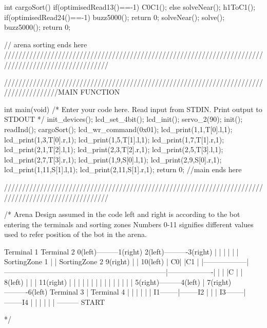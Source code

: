 int cargoSort()
{
    if(optimisedRead13()==-1)
	{
		C0C1();
	}
	else
	{
		solveNear();
		h1ToC1();
    }
	if(optimisedRead24()==-1)
	{
		buzz5000();
		return 0;
	}
    solveNear();
    solve();
    buzz5000();
	return 0;
}

// arena sorting ends here
/////////////////////////////////////////////////////////////////////////////////////////////////////


///////////////////////////////////////////////////////////////////////////////////////MAIN FUNCTION

int main(void)
{
    /* Enter your code here. Read input from STDIN. Print output to STDOUT */
    init_devices();
	lcd_set_4bit();
	lcd_init();
	servo_2(90);
	init();
	readInd();
    cargoSort();
	lcd_wr_command(0x01);
	lcd_print(1,1,T[0].l,1);
	lcd_print(1,3,T[0].r,1);
	lcd_print(1,5,T[1].l,1);
	lcd_print(1,7,T[1].r,1);
	lcd_print(2,1,T[2].l,1);
	lcd_print(2,3,T[2].r,1);
    lcd_print(2,5,T[3].l,1);
	lcd_print(2,7,T[3].r,1);
	lcd_print(1,9,S[0].l,1);
	lcd_print(2,9,S[0].r,1);
	lcd_print(1,11,S[1].l,1);
	lcd_print(2,11,S[1].r,1);
	return 0;
} //main ends here

/////////////////////////////////////////////////////////////////////////////////////////////////////


/*
Arena Design assumed in the code
left and right is according to the bot entering the terminals and sorting zones
Numbers 0-11 signifies different values used to refer position of the bot in the arena.


			
					Terminal 1 																Terminal 2
				0(left)---------1(right)											2(left)----------3(right)
						   |																	|
						   |																	|
						   |																	|
	  SortingZone 1		   |																	|			  SortingZone 2
		9(right)		   |																	|				10(left)
		|				 C0|																	|C1					|
		|------------------|--------------------------------------------------------------------|-------------------|
		|				   |								|C									|					|
		8(left)			   |								|									|				11(right)
						   |								|									|
						   |								|									|
						   |								|									|
						   |								|									|
						   |								|									|
			   5(right)---------4(left)						|						7(right)----------6(left)
					Terminal 3 								|								Terminal 4
															|
															|
															|
															|
															|
															|
												  I1--------|--------I2
															|
															|
															|
												  I3--------|--------I4
															|
															|
															|
															|
															|
															|
														---------
														  START
														

*/

